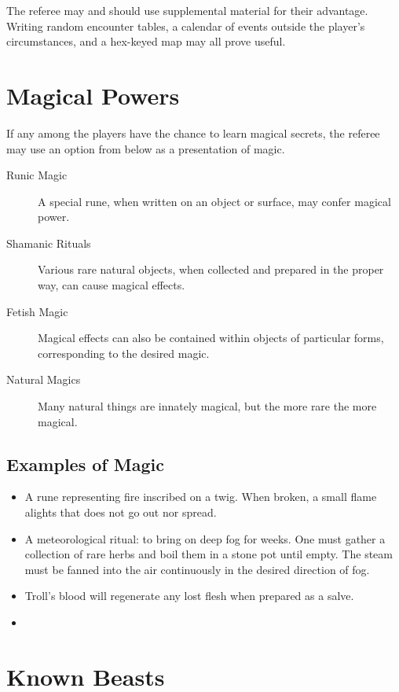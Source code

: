 \documentclass{article}
\begin{document}
\begin{multicols}{2}
The referee may and should use supplemental material for their advantage. Writing random encounter tables, a calendar of events outside the player's circumstances, and a hex-keyed map may all prove useful.

\section{Magical Powers}

If any among the players have the chance to learn magical secrets, the referee may use an option from below as a presentation of magic.

\begin{description}
\item[Runic Magic] A special rune, when written on an object or surface, may confer magical power. 
\item[Shamanic Rituals] Various rare natural objects, when collected and prepared in the proper way, can cause magical effects.
\item[Fetish Magic] Magical effects can also be contained within objects of particular forms, corresponding to the desired magic.
\item[Natural Magics] Many natural things are innately magical, but the more rare the more magical.
\end{description}

\subsection{Examples of Magic}

\begin{itemize}
\item A rune representing fire inscribed on a twig. When broken, a small flame alights that does not go out nor spread.
\item A meteorological ritual: to bring on deep fog for weeks. One must gather a collection of rare herbs and boil them in a stone pot until empty. The steam must be fanned into the air continuously in the desired direction of fog. 
\item Troll's blood will regenerate any lost flesh when prepared as a salve.
\item 
\end{itemize}

\section{Known Beasts}


\end{multicols}
\end{document}
